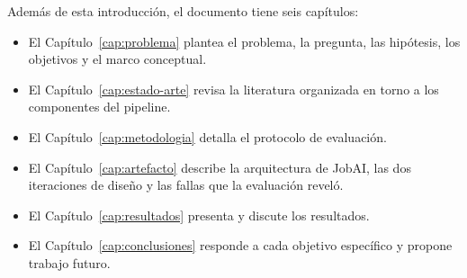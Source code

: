 Además de esta introducción, el documento tiene seis capítulos:
\begin{itemize}
    \item El Capítulo~\ref{cap:problema} plantea el problema, la pregunta, las hipótesis, los objetivos y el marco conceptual.
    \item El Capítulo~\ref{cap:estado-arte} revisa la literatura organizada en torno a los componentes del pipeline.
    \item El Capítulo~\ref{cap:metodologia} detalla el protocolo de evaluación.
    \item El Capítulo~\ref{cap:artefacto} describe la arquitectura de JobAI, las dos iteraciones de diseño y las fallas que la evaluación reveló.
    \item El Capítulo~\ref{cap:resultados} presenta y discute los resultados.
    \item El Capítulo~\ref{cap:conclusiones} responde a cada objetivo específico y propone trabajo futuro.
\end{itemize}
